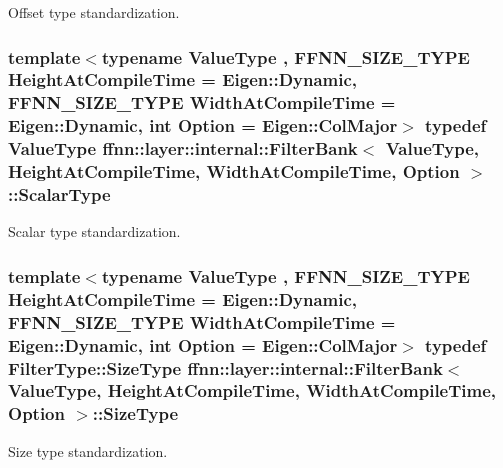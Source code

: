 Offset type standardization. 

\hypertarget{structffnn_1_1layer_1_1internal_1_1_filter_bank_ab182aa55b8688535027636e0a916bcbc}{
\subsubsection[{Scalar\-Type}]{\setlength{\rightskip}{0pt plus 5cm}template$<$typename Value\-Type , F\-F\-N\-N\-\_\-\-S\-I\-Z\-E\-\_\-\-T\-Y\-P\-E Height\-At\-Compile\-Time = Eigen\-::\-Dynamic, F\-F\-N\-N\-\_\-\-S\-I\-Z\-E\-\_\-\-T\-Y\-P\-E Width\-At\-Compile\-Time = Eigen\-::\-Dynamic, int Option = Eigen\-::\-Col\-Major$>$ typedef Value\-Type {\bf ffnn\-::layer\-::internal\-::\-Filter\-Bank}$<$ Value\-Type, Height\-At\-Compile\-Time, Width\-At\-Compile\-Time, Option $>$\-::{\bf Scalar\-Type}}}\label{structffnn_1_1layer_1_1internal_1_1_filter_bank_ab182aa55b8688535027636e0a916bcbc}


Scalar type standardization. 

\hypertarget{structffnn_1_1layer_1_1internal_1_1_filter_bank_af9efd4275b52c4222e82cfa9f6514ebb}{
\subsubsection[{Size\-Type}]{\setlength{\rightskip}{0pt plus 5cm}template$<$typename Value\-Type , F\-F\-N\-N\-\_\-\-S\-I\-Z\-E\-\_\-\-T\-Y\-P\-E Height\-At\-Compile\-Time = Eigen\-::\-Dynamic, F\-F\-N\-N\-\_\-\-S\-I\-Z\-E\-\_\-\-T\-Y\-P\-E Width\-At\-Compile\-Time = Eigen\-::\-Dynamic, int Option = Eigen\-::\-Col\-Major$>$ typedef {\bf Filter\-Type\-::\-Size\-Type} {\bf ffnn\-::layer\-::internal\-::\-Filter\-Bank}$<$ Value\-Type, Height\-At\-Compile\-Time, Width\-At\-Compile\-Time, Option $>$\-::{\bf Size\-Type}}}\label{structffnn_1_1layer_1_1internal_1_1_filter_bank_af9efd4275b52c4222e82cfa9f6514ebb}


Size type standardization. 



